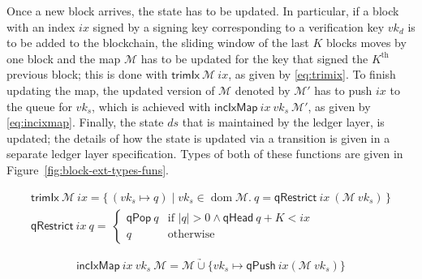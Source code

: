 \documentclass[11pt,a4paper]{article}
\DeclareMathOperator{\dom}{dom}
\newcommand\Set[2]{\{\,#1\mid#2\,\}}
\newcommand{\unionoverride}{\mathbin{\underrightarrow\cup}}
\newcommand{\var}[1]{\mathit{#1}}
\newcommand{\fun}[1]{\mathsf{#1}}
\newcommand{\size}[1]{\left| #1 \right|}
\newcommand{\signmapname}{\mathcal{M}}
\newcommand{\trimixname}{trimIx}
\newcommand{\incixmapname}{incIxMap}
\newcommand{\qrestrname}{qRestrict}
\newcommand{\qpopname}{qPop}
\newcommand{\qheadname}{qHead}
\newcommand{\qpushname}{qPush}
\newcommand{\signmap}[1]{\fun{\signmapname} ~ #1}
\newcommand{\qrestr}[2]{\fun{\qrestrname} ~ #1 ~ #2}
\newcommand{\trimix}[2]{\fun{\trimixname} ~ #1 ~ #2}
\newcommand{\incixmap}[3]{\fun{\incixmapname} ~ #1 ~ #2 ~ #3}
\newcommand{\qpop}[1]{\fun{\qpopname} ~ #1}
\newcommand{\qhead}[1]{\fun{\qheadname} ~ #1}
\newcommand{\qpush}[1]{\fun{\qpushname} ~ #1}
\newcommand{\partialf}{\mapsto}
\begin{document}
Once a new block arrives, the state has to be updated.
%
In particular, if a block with an index $\var{ix}$ signed by a signing key
corresponding to a verification key $\var{vk_d}$ is to be added to the
blockchain, the sliding window of the last $K$ blocks moves by one block and
the map $\fun{\signmapname}$ has to be updated for the key that signed the
$K^{\text{th}}$ previous block;
%
this is done with $\trimix{\signmapname}{\var{ix}}$, as given by
\eqref{eq:trimix}.
%
To finish updating the map, the updated version of $\signmapname$ denoted by
$\signmapname'$ has to push $\var{ix}$ to the queue for $\var{vk_s}$, which is
achieved with $\incixmap{\var{ix}}{\var{vk_s}}{\signmapname'}$, as given by
\eqref{eq:incixmap}.
%
Finally, the state $\var{ds}$ that is maintained by the ledger layer, is
updated; the details of how the state is updated via a transition is given in
a separate ledger layer specification.
%
Types of both of these functions are given in
Figure~\ref{fig:block-ext-types-funs}.


\begin{align}
  \label{eq:trimix}
  \trimix{\signmapname}{\var{ix}} = \Set{(\var{vk_s} \partialf q)}{\var{vk_s} \in \dom \signmapname.~
  q = \qrestr{\var{ix}}{(\signmap{\var{vk_s}}})} \\
  \qrestr{\var{ix}}{q} = \
  \begin{cases}
    \qpop{q} & \text{if } \size{q} > 0 \wedge \qhead{q} + K < \var{ix} \\
    q & \text{otherwise}
  \end{cases}
\end{align}

\begin{equation}
  \label{eq:incixmap}
  \incixmap{\var{ix}}{\var{vk_s}}{\signmapname} = \signmapname \unionoverride \{\var{vk_s} \partialf \qpush{\var{ix}}{(\signmap{\var{vk_s}})}\}
\end{equation}
\end{document}
